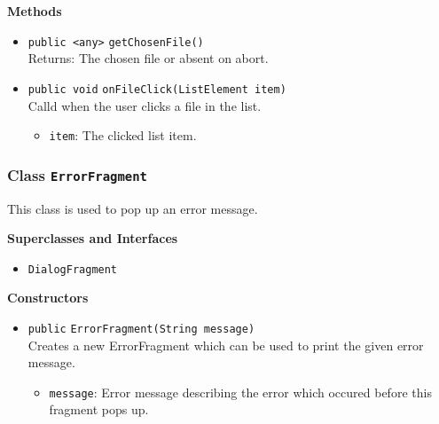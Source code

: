 \textbf{Methods}
\begin{itemize}
\item \lstinline|public <any>| \lstinline|getChosenFile|\lstinline|()|\\
Returns: The chosen file or absent on abort.



\item \lstinline|public void| \lstinline|onFileClick|\lstinline|(ListElement item)|\\
Calld when the user clicks a file in the list.
\begin{itemize}
\item \lstinline|item|: The clicked list item.
\end{itemize}



\end{itemize}

\subsubsection{Class \lstinline|ErrorFragment|}
This class is used to pop up an error message. \\



\textbf{Superclasses and Interfaces}
\begin{itemize}
\item \lstinline|DialogFragment|
\end{itemize}



\textbf{Constructors}
\begin{itemize}
\item \lstinline|public| \lstinline|ErrorFragment|\lstinline|(String message)|\\
Creates a new ErrorFragment which can be used to print the given error message.
\begin{itemize}
\item \lstinline|message|: Error message describing the error which occured before this fragment pops up.
\end{itemize}



\end{itemize}



